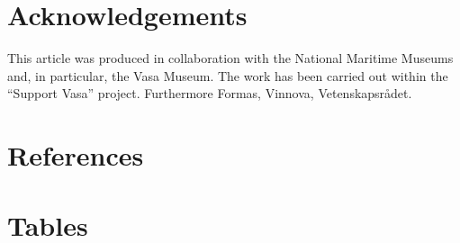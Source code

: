 \documentclass[review]{elsarticle}
\begin{document}
\section*{Acknowledgements}
This article was produced in collaboration with the National Maritime Museums
and, in particular, the Vasa Museum. The work has been carried
out within the ``Support Vasa'' project. Furthermore  Formas, Vinnova,
Vetenskapsr{\aa}det. \section*{References}



\pagebreak
\section*{Tables}
\end{document}
